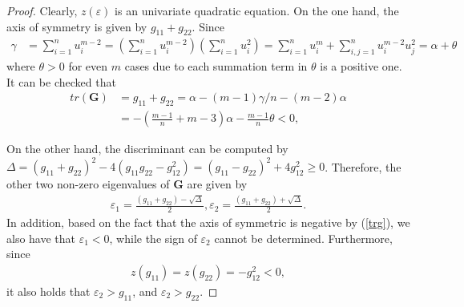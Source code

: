 \begin{proof}

Clearly,  $ z(\varepsilon) $ is  an
univariate quadratic equation.
On the  one  hand, 
 the   axis of symmetry
is  
given  by  
$g_{11} +g_{22}$.
Since 
\begin{align}\label{gammaalpha}
\gamma
&=
  \sum\limits_{i=1}^{n}  u_{i}^{m-2}
  =
 (  \sum\limits_{i=1}^{n}  u_{i}^{m-2}) 
 (  \sum\limits_{i=1}^{n}  u_{i}^{2}) 
 =
 \sum\limits_{i=1}^{n}  u_{i}^{m}
 +
 \sum\limits_{i,j=1}^{n}  u_{i}^{m-2} u_{j}^{2}
 =
 \alpha + \theta
\end{align} 
where 
$  \theta >0$  for  even  $m$  cases due  to  each  summation  term in   $ \theta $ is a  positive one.
It can be checked that 
\begin{align}\label{trg}
 tr(\mathbf G)
 &= g_{11} +g_{22}
=
  \alpha - (m-1)\gamma/n -  (m-2)\alpha
 \nonumber \\
 &=
- ( \frac {m-1}{n} +m-3) \alpha - 
 \frac {m-1}{n}  \theta
<0, 
 \end{align} 

   
On the  other  hand,     the discriminant
can be  computed  by 
   $ 
   \Delta = (g_{11} +g_{22})^{2} - 4(g_{11} g_{22} - g_{12}^{2} ) 
   =
   (g_{11} -  g_{22})^{2} +4 g_{12}^{2}   \ge 0$. 
Therefore, 
the  other   two  non-zero  eigenvalues  of  
$ \mathbf G$  
are  given  by 
 \begin{align}
\varepsilon_{1} = 
 \frac{ (g_{11}+g_{22}) - \sqrt{\Delta}}{2}, 
 \varepsilon_{2}
 =
  \frac{ (g_{11}+g_{22})  + \sqrt{\Delta}}{2}.
  \end{align} 
In  addition,  
based on   the  fact  that  the  axis of  symmetric  is negative  by (\ref{trg}), we also  have  that  
$ \varepsilon_{1} < 0$, while the sign of 
$ \varepsilon_{2} $ 
cannot be  determined.
Furthermore, 
since 
\begin{align}
z(g_{11}) 
=
z(g_{22}) 
=
-
g_{12}^{2}
<0 ,
\end{align}
it also  holds  that 
$
\varepsilon_{2}
> 
g_{11}$, 
and 
$
\varepsilon_{2}
> 
g_{22}$.


\end{proof}
